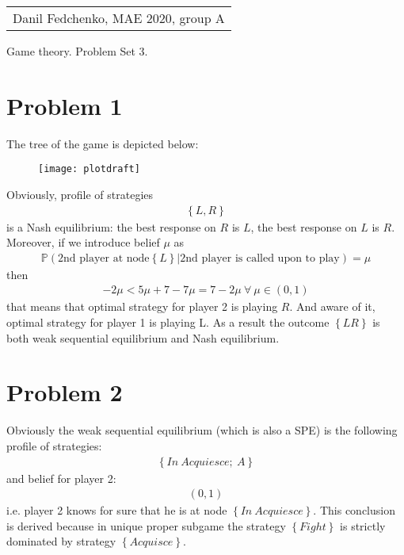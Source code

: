 \documentclass[a4paper]{article}
\newcommand{\prob}{\mathbb{P}}
\begin{document}
	\begin{flushright}
	\begin{tabular}{r}
		Danil Fedchenko, MAE 2020, group A \\
	\end{tabular}
\end{flushright}


\begin{center}
	Game theory. Problem Set 3.
\end{center}
\section*{Problem 1}
The tree of the game is depicted below:
\begin{figure}[H]
	\centering
	\texttt{[image: plotdraft]}
	\caption{}\label{fig1}
\end{figure}
Obviously, profile of strategies
\begin{align*}
\left\{L, R\right\}
\end{align*}
is a Nash equilibrium: the best response on $R$ is $L$, the best response on $L$ is $R$. Moreover, if we introduce belief $\mu$ as
\begin{align*}
\prob (\text{2nd player at node} \left\{L\right\}|\text{2nd player is called upon to play}) = \mu
\end{align*}
then 
\begin{align*}
-2 \mu < 5\mu + 7 - 7 \mu = 7 - 2\mu\ \forall\ \mu \in (0, 1)
\end{align*}
that means that optimal strategy for player 2 is playing $R$. And aware of it, optimal strategy for player 1 is playing L. As a result the outcome $\left\{LR\right\}$ is both weak sequential equilibrium and Nash equilibrium.
\section*{Problem 2}
Obviously the weak sequential equilibrium (which is also a SPE) is the following profile of strategies:
\begin{align*}
\left\{In\ Acquiesce;\ A\right\}
\end{align*}
and belief for player 2:
\begin{align*}
(0, 1)
\end{align*}
i.e. player 2 knows for sure that he is at node $\left\{In\ Acquiesce\right\}$. This conclusion is derived because in unique proper subgame the strategy $\left\{Fight\right\}$ is strictly dominated by strategy $\left\{Acquisce\right\}$.
\end{document}
